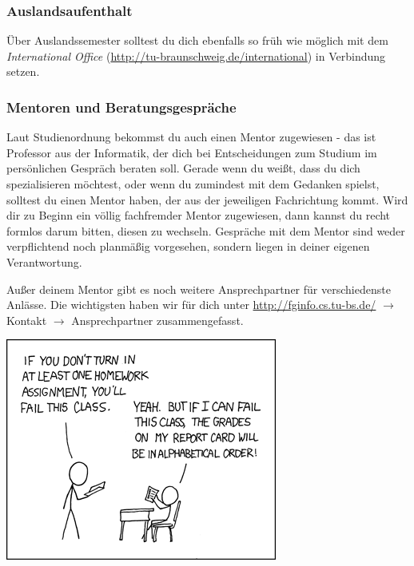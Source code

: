 \subsubsection{Auslandsaufenthalt}
	Über Auslandssemester solltest du dich ebenfalls so früh wie möglich mit dem \emph{International Office} (\url{http://tu-braunschweig.de/international}) in Verbindung setzen.

\subsubsection{Mentoren und Beratungsgespräche}
	Laut Studienordnung bekommst du auch einen Mentor zugewiesen - das ist Professor aus der Informatik, der dich bei Entscheidungen zum Studium im persönlichen Gespräch beraten soll. Gerade wenn du weißt, dass du dich spezialisieren möchtest, oder wenn du zumindest mit dem Gedanken spielst, solltest du einen Mentor haben, der aus der jeweiligen Fachrichtung kommt. Wird dir zu Beginn ein völlig fachfremder Mentor zugewiesen, dann kannst du recht formlos darum bitten, diesen zu wechseln. Gespräche mit dem Mentor sind weder verpflichtend noch planmäßig vorgesehen, sondern liegen in deiner eigenen Verantwortung.

	Außer deinem Mentor gibt es noch weitere Ansprechpartner für verschiedenste Anlässe. Die wichtigsten haben wir für dich unter  \url{http://fginfo.cs.tu-bs.de/} $\rightarrow$ Kontakt $\rightarrow$ Ansprechpartner zusammengefasst.
\begin{center}
\includegraphics[totalheight=6cm]{bilder/XKCD/priorities}
\end{center}

